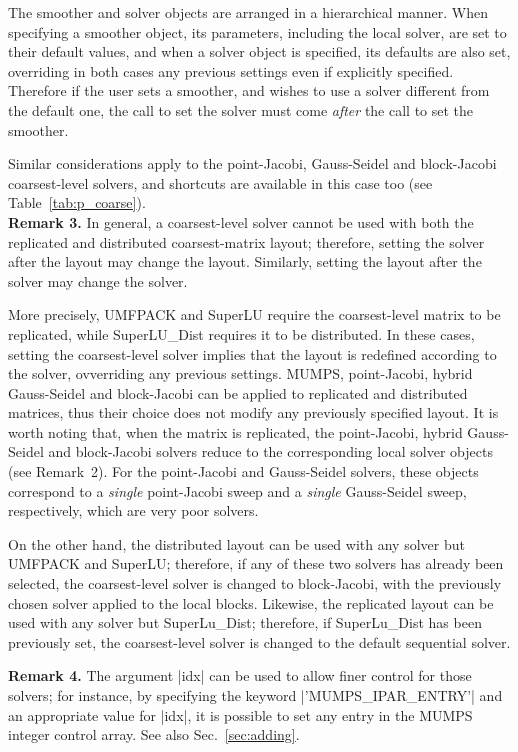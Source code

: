 The smoother and solver objects are arranged in a
hierarchical manner. When specifying a smoother object, its parameters,
including the local solver, are set to their default values, and when a solver
object is specified, its defaults are also set, overriding in both
cases any previous settings even if explicitly specified. Therefore if
the user sets a smoother, and wishes to use a solver
different from  the default one, the call to set the solver must come
\emph{after} the call to set the smoother.

Similar considerations apply to the point-Jacobi, Gauss-Seidel and block-Jacobi
coarsest-level solvers, and shortcuts are available
in this case too (see Table~\ref{tab:p_coarse}). \\

\textbf{Remark 3.} In general, a coarsest-level solver cannot be used with
both the replicated and distributed coarsest-matrix layout;
therefore, setting the solver after the layout may change the layout.
Similarly, setting the layout after the solver may change the solver.

More precisely, UMFPACK and SuperLU require the coarsest-level
matrix to be replicated, while SuperLU\_Dist requires it to be distributed.
In these cases, setting the coarsest-level solver implies that
the layout is redefined according to the solver, ovverriding any
previous settings. MUMPS,  point-Jacobi,
hybrid Gauss-Seidel and block-Jacobi can be applied to
replicated and distributed matrices, thus their choice
does not modify any previously specified layout.
It is worth noting that, when the matrix is replicated,
the point-Jacobi, hybrid Gauss-Seidel and block-Jacobi solvers
reduce to the corresponding local solver objects (see Remark~2).
For the point-Jacobi and Gauss-Seidel solvers, these objects
correspond to a \emph{single} point-Jacobi sweep and a \emph{single}
Gauss-Seidel sweep, respectively, which are very poor solvers.

On the other hand, the distributed layout can be used with any solver
but UMFPACK and SuperLU; therefore, if any of these two solvers has already
been selected, the coarsest-level solver is changed to block-Jacobi,
with the previously chosen solver applied to the local blocks.
Likewise, the replicated layout can be used with any solver but SuperLu\_Dist;
therefore, if SuperLu\_Dist has been previously set, the coarsest-level
solver is changed to the default sequential solver.

\textbf{Remark 4.}  The argument \fortinline|idx| can be used to allow finer
control for those solvers; for instance, by specifying the keyword
\fortinline|'MUMPS_IPAR_ENTRY'| and an appropriate value for \fortinline|idx|, it is
possible to set any entry in the MUMPS integer control array.
See also Sec.~\ref{sec:adding}.


